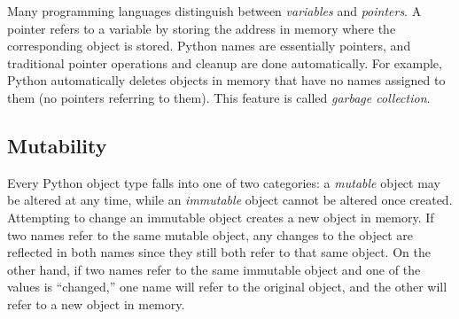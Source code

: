 \begin{info}
Many programming languages distinguish between \emph{variables} and \emph{pointers}.
A pointer refers to a variable by storing the address in memory where the corresponding object is stored.
Python names are essentially pointers, and traditional pointer operations and cleanup are done automatically.
For example, Python automatically deletes objects in memory that have no names assigned to them (no pointers referring to them).
This feature is called \emph{garbage collection}.
\end{info}

\subsection*{Mutability} %

Every Python object type falls into one of two categories: a \emph{mutable} object may be altered at any time, while an \emph{immutable} object cannot be altered once created.
Attempting to change an immutable object creates a new object in memory.
If two names refer to the same mutable object, any changes to the object are reflected in both names since they still both refer to that same object.
On the other hand, if two names refer to the same immutable object and one of the values is ``changed,'' one name will refer to the original object, and the other will refer to a new object in memory.

